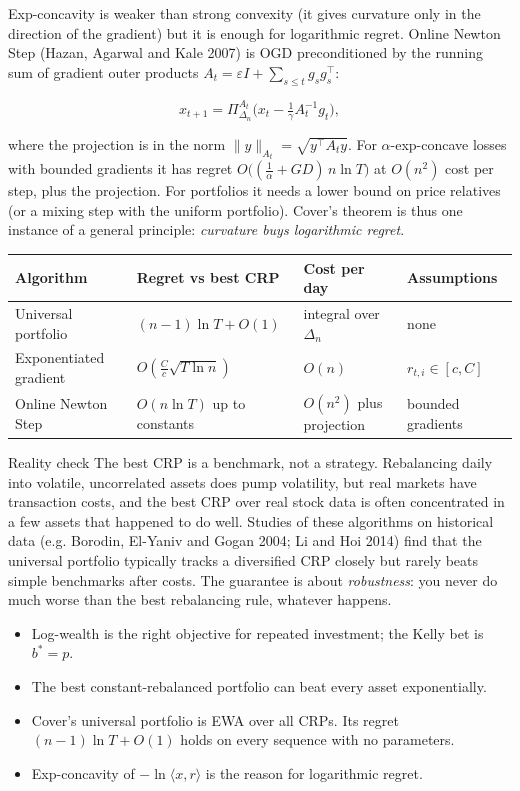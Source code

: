 \documentclass[11pt,a4paper,openany]{book}
\newcommand{\eps}{\varepsilon}
\newcommand{\ip}[2]{\langle #1,#2\rangle}
\newcommand{\norm}[1]{\lVert #1\rVert}
\newcommand{\simplex}{\Delta}
\begin{document}
Exp-concavity is weaker than strong convexity (it gives curvature only in the direction of the gradient) but it is enough for logarithmic regret. Online Newton Step (Hazan, Agarwal and Kale 2007) is OGD preconditioned by the running sum of gradient outer products $A_t=\eps I+\sum_{s\le t}g_sg_s^\top$:

\[x_{t+1}=\Pi^{A_t}_{\simplex_n}\big(x_t-\tfrac1\gamma A_t^{-1}g_t\big),\]

where the projection is in the norm $\norm{y}_{A_t}=\sqrt{y^\top A_ty}$. For $\alpha$-exp-concave losses with bounded gradients it has regret $O\big((\frac1\alpha+GD)\,n\ln T\big)$ at $O(n^2)$ cost per step, plus the projection. For portfolios it needs a lower bound on price relatives (or a mixing step with the uniform portfolio). Cover's theorem is thus one instance of a general principle: \emph{curvature buys logarithmic regret}.

\begin{center}\small
\begin{tabularx}{\linewidth}{YYYY}
\toprule
\textbf{Algorithm} & \textbf{Regret vs best CRP} & \textbf{Cost per day} & \textbf{Assumptions} \\
\midrule
Universal portfolio & $(n-1)\ln T+O(1)$ & integral over $\simplex_n$ & none \\
Exponentiated gradient & $O(\frac Cc\sqrt{T\ln n})$ & $O(n)$ & $r_{t,i}\in[c,C]$ \\
Online Newton Step & $O(n\ln T)$ up to constants & $O(n^2)$ plus projection & bounded gradients \\
\bottomrule
\end{tabularx}
\end{center}

\begin{bwarn}{Reality check}
The best CRP is a benchmark, not a strategy. Rebalancing daily into volatile, uncorrelated assets does pump volatility, but real markets have transaction costs, and the best CRP over real stock data is often concentrated in a few assets that happened to do well. Studies of these algorithms on historical data (e.g. Borodin, El-Yaniv and Gogan 2004; Li and Hoi 2014) find that the universal portfolio typically tracks a diversified CRP closely but rarely beats simple benchmarks after costs. The guarantee is about \emph{robustness}: you never do much worse than the best rebalancing rule, whatever happens.
\end{bwarn}

\begin{takeaways}
\begin{itemize}
\item Log-wealth is the right objective for repeated investment; the Kelly bet is $b^*=p$.
\item The best constant-rebalanced portfolio can beat every asset exponentially.
\item Cover's universal portfolio is EWA over all CRPs. Its regret $(n-1)\ln T+O(1)$ holds on every sequence with no parameters.
\item Exp-concavity of $-\ln\ip{x}{r}$ is the reason for logarithmic regret.
\end{itemize}
\end{takeaways}
\end{document}
